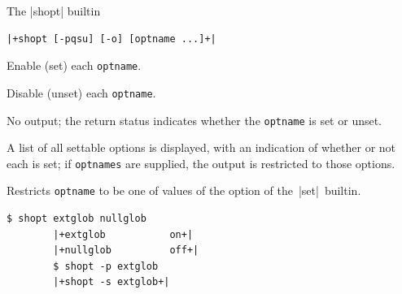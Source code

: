 \begin{frame}[fragile]{The \bash|shopt| builtin}{}
    \vspace{-1mm}
    \begin{lstlisting}[style=myBash, numbers=none]
        |+shopt [-pqsu] [-o] [optname ...]+|
    \end{lstlisting}
    \vspace{2mm}
    \begin{description}
        \item[\PB{\texttt{-s}}]
            Enable (set) each \texttt{optname}.
        \item[\PB{\texttt{-u}}]
            Disable (unset) each \texttt{optname}.
        \item[\PB{\texttt{-q}}]
            No output; the return status indicates whether the \texttt{optname} is set or unset.\\[-1mm]
        \item[\PB{\texttt{-p}}]
            A list of all settable options is displayed, with an indication of whether or not each is set; if \texttt{optnames} are supplied, the output is restricted to those options.\\[-1mm]
        \item[\PB{\texttt{-o}}]
            Restricts \texttt{optname} to be one of values of the  option of the \,\bash|set|\, builtin.
    \end{description}
    \begin{lstlisting}[style=myBash, aboveskip=2mm]
        $ shopt extglob nullglob
        |+extglob           on+|
        |+nullglob          off+|
        $ shopt -p extglob
        |+shopt -s extglob+|
    \end{lstlisting}
\end{frame}
